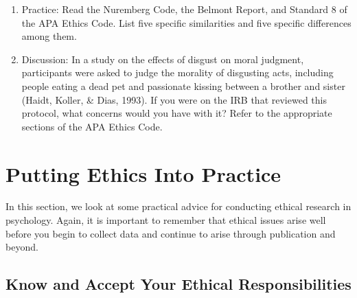 \begin{fullwidth}

\begin{enumerate}

\item Practice: Read the Nuremberg Code, the Belmont Report, and Standard 8 of the APA Ethics Code. List five specific similarities and five specific differences among them.

\item Discussion: In a study on the effects of disgust on moral judgment, participants were asked to judge the morality of disgusting acts, including people eating a dead pet and passionate kissing between a brother and sister (Haidt, Koller, \& Dias, 1993). If you were on the IRB that reviewed this protocol, what concerns would you have with it? Refer to the appropriate sections of the APA Ethics Code.

\end{enumerate}

\end{fullwidth}  

\newpage
\section{Putting Ethics Into Practice}

 
In this section, we look at some practical advice for conducting ethical research in psychology. Again, it is important to remember that ethical issues arise well before you begin to collect data and continue to arise through publication and beyond.

\subsection{Know and Accept Your Ethical Responsibilities}


